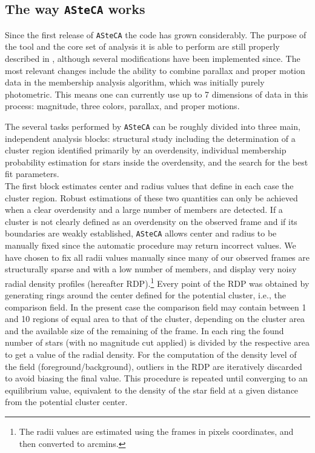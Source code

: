 \documentclass[draft]{aa}
\begin{document}
\subsection{The way \texttt{ASteCA} works}
\label{ssec:asteca_works}

Since the first release of \texttt{ASteCA} the code has grown
considerably. The purpose of the tool and the core set of analysis it is able
to perform are still properly described in \cite{Perren_2015}, although
several modifications have been implemented since. The most relevant changes
include the ability to combine parallax and proper motion data in the
membership analysis algorithm, which was initially purely photometric. This
means one can currently use up to 7 dimensions of data in this process:
magnitude, three colors, parallax, and proper motions.

The several tasks performed by \texttt{ASteCA} can be roughly divided into three
main, independent analysis blocks: structural study including the
determination of a cluster region identified primarily by an overdensity,
individual membership probability estimation for stars inside the overdensity,
and the search for the best fit parameters.\\

The first block estimates center and radius values that define in each case the
cluster region. Robust estimations of these two quantities can only be achieved
when a clear overdensity and a large number of members are detected.
If a cluster is not clearly defined as an overdensity on the observed frame and
if its boundaries are weakly established, \texttt{ASteCA} allows center and
radius to be manually fixed since the automatic procedure may return incorrect
values. We have chosen to fix all radii values manually since many of
our observed frames are structurally sparse and with a low number of members,
and display very noisy radial density profiles (hereafter RDP).\footnote{
The radii values are estimated using the frames in pixels coordinates,
and then converted to arcmins.
}
%
Every point of the RDP was obtained by generating rings around the
center defined for the potential cluster, i.e., the comparison field.
%
In the present case the comparison field may contain between 1 and 10 regions
of equal area to that of the cluster, depending on the cluster area and the
available size of the remaining of the frame. In each ring the found number of
stars (with no magnitude cut applied) is divided by the respective
area to get a value of the radial density.
%
For the computation of the density level of the field (foreground/background),
outliers in the RDP are iteratively discarded to avoid biasing the final value.
This procedure is repeated until converging to an equilibrium value, equivalent
to the density of the star field at a given distance from the potential
cluster center.
\end{document}
